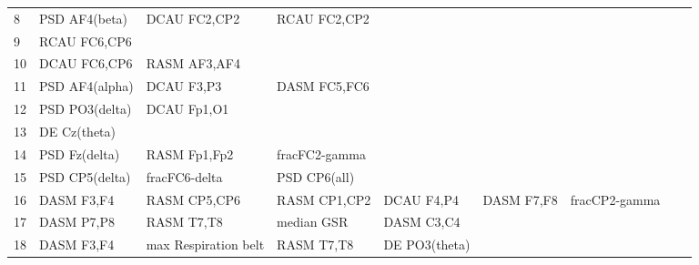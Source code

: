 \begin{landscape}
\begin{table}[]
\begin{tabular}{l|llllllll}
8                  & PSD AF4(beta)        & DCAU FC2,CP2            & RCAU FC2,CP2         &                    &                       &                      &                 &                 \\
9                  & RCAU FC6,CP6         &                         &                      &                    &                       &                      &                 &                 \\
10                 & DCAU FC6,CP6         & RASM AF3,AF4            &                      &                    &                       &                      &                 &                 \\
11                 & PSD AF4(alpha)       & DCAU F3,P3              & DASM FC5,FC6         &                    &                       &                      &                 &                 \\
12                 & PSD PO3(delta)       & DCAU Fp1,O1             &                      &                    &                       &                      &                 &                 \\
13                 & DE Cz(theta)         &                         &                      &                    &                       &                      &                 &                 \\
14                 & PSD Fz(delta)        & RASM Fp1,Fp2            & fracFC2-gamma        &                    &                       &                      &                 &                 \\
15                 & PSD CP5(delta)       & fracFC6-delta           & PSD CP6(all)         &                    &                       &                      &                 &                 \\
16                 & DASM F3,F4           & RASM CP5,CP6            & RASM CP1,CP2         & DCAU F4,P4         & DASM F7,F8            & fracCP2-gamma        &                 &                 \\
17                 & DASM P7,P8           & RASM T7,T8              & median GSR           & DASM C3,C4         &                       &                      &                 &                 \\
18                 & DASM F3,F4           & max Respiration belt    & RASM T7,T8           & DE PO3(theta)      &                       &                      &                 &                 \\

\end{tabular}
\end{table}
\end{landscape}
